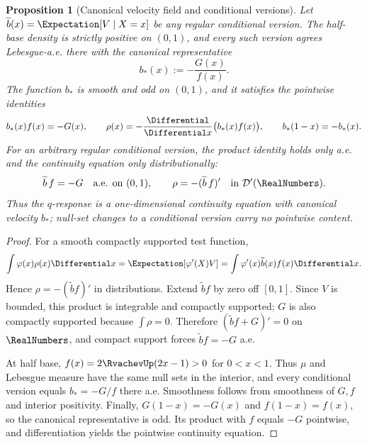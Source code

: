 \documentclass[11pt,oneside]{article}
\newtheorem{proposition}[theorem]{Proposition}
\theoremstyle{definition}
\theoremstyle{remark}
\begin{document}
\begin{proposition}[Canonical velocity field and conditional versions]
\label{prop:velocity-field}
Let
\(
 \widetilde b(x)=\Expectation[V\mid X=x]
\)
be any regular conditional version.  The half-base density is strictly positive on
\((0,1)\), and every such version agrees Lebesgue-a.e. there with the canonical representative
\begin{equation}
 b_*(x):=-\frac{G(x)}{f(x)}.
 \label{eq:canonical-velocity}
\end{equation}
The function \(b_*\) is smooth and odd on \((0,1)\), and it satisfies the pointwise identities
\begin{equation}
 b_*(x)f(x)=-G(x),
 \qquad
 \rho(x)=-\frac{\Differential}{\Differential x}\bigl(b_*(x)f(x)\bigr),
 \qquad b_*(1-x)=-b_*(x).
 \label{eq:velocity-form}
\end{equation}
For an arbitrary regular conditional version, the product identity holds only a.e. and the
continuity equation only distributionally:
\[
 \widetilde b\,f=-G\quad\text{a.e. on }(0,1),
 \qquad \rho=-(\widetilde b\,f)' \quad\text{in }\mathcal D'(\RealNumbers).
\]
Thus the \(q\)-response is a one-dimensional continuity equation with canonical velocity
\(b_*\); null-set changes to a conditional version carry no pointwise content.
\end{proposition}

\begin{proof}
For a smooth compactly supported test function,
\[
 \int\varphi(x)\rho(x)\Differential x
 =\Expectation[\varphi'(X)V]
 =\int\varphi'(x)\widetilde b(x)f(x)\Differential x.
\]
Hence \(\rho=-(\widetilde b f)'\) in distributions.  Extend
\(\widetilde b f\) by zero off \([0,1]\).  Since \(V\) is bounded, this product is integrable
and compactly supported; \(G\) is also compactly supported because \(\int\rho=0\).  Therefore
\((\widetilde b f+G)'=0\) on \(\RealNumbers\), and compact support forces
\(\widetilde b f=-G\) a.e.

At half base, \(f(x)=2\RvachevUp(2x-1)>0\) for \(0<x<1\).  Thus \(\mu\) and Lebesgue measure have the
same null sets in the interior, and every conditional version equals
\(b_*=-G/f\) there a.e.  Smoothness follows from smoothness of \(G,f\) and interior positivity.
Finally, \(G(1-x)=-G(x)\) and \(f(1-x)=f(x)\), so the canonical representative is odd.
Its product with \(f\) equals \(-G\) pointwise, and differentiation yields the pointwise
continuity equation.
\end{proof}
\end{document}
